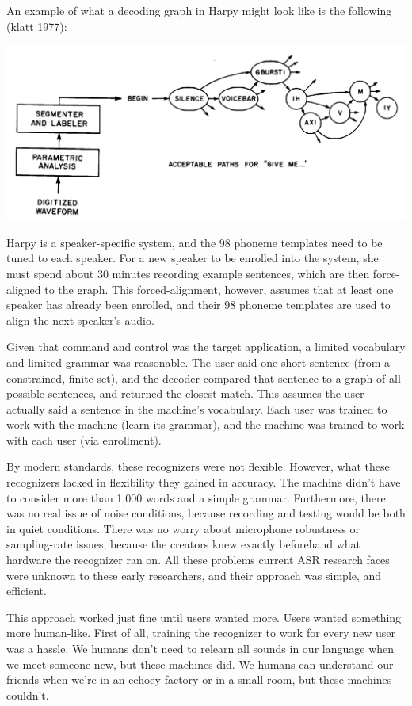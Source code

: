 \documentclass[10pt,a4paper]{article}
\begin{document}
An example of what a decoding graph in Harpy might look like is the following (klatt 1977):


\begin{center}
\includegraphics[width=.9\textwidth,keepaspectratio]{figs/harpy-graph.png}
\end{center}


Harpy is a speaker-specific system, and the 98 phoneme templates need to be tuned to each speaker. For a new speaker to be enrolled into the system, she must spend about 30 minutes recording example sentences, which are then force-aligned to the graph. This forced-alignment, however, assumes that at least one speaker has already been enrolled, and their 98 phoneme templates are used to align the next speaker's audio.

Given that command and control was the target application, a limited vocabulary and limited grammar was reasonable. The user said one short sentence (from a constrained, finite set), and the decoder compared that sentence to a graph of all possible sentences, and returned the closest match. This assumes the user actually said a sentence in the machine's vocabulary. Each user was trained to work with the machine (learn its grammar), and the machine was trained to work with each user (via enrollment). 

By modern standards, these recognizers were not flexible. However, what these recognizers lacked in flexibility they gained in accuracy. The machine didn't have to consider more than 1,000 words and a simple grammar. Furthermore, there was no real issue of noise conditions, because recording and testing would be both in quiet conditions. There was no worry about microphone robustness or sampling-rate issues, because the creators knew exactly beforehand what hardware the recognizer ran on. All these problems current ASR research faces were unknown to these early researchers, and their approach was simple, and efficient.

This approach worked just fine until users wanted more. Users wanted something more human-like. First of all, training the recognizer to work for every new user was a hassle. We humans don't need to relearn all sounds in our language when we meet someone new, but these machines did. We humans can understand our friends when we're in an echoey factory or in a small room, but these machines couldn't.
\end{document}
